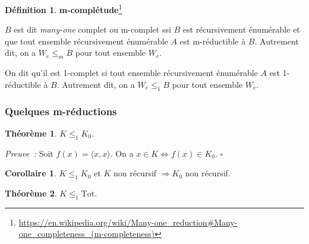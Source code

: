 \documentclass{book}
\theoremstyle{definition}
\newtheorem{theorem}{Théorème}
\newtheorem{definition}{Définition}
\newtheorem{corollary}{Corollaire}
\numberwithin{lemma}{subsection}
\numberwithin{theorem}{subsection}
\numberwithin{definition}{subsection}
\numberwithin{proposition}{subsection}
\numberwithin{corollary}{subsection}
\numberwithin{property}{subsection}
\numberwithin{example}{subsection}
\numberwithin{heuristique}{subsection}
\numberwithin{scenario}{subsection}
\newenvironment{proofi} {\noindent\emph{Preuve~:}} {\hfill $\square$\vspace{0.2cm}}
\newcommand{\Pairing}[1]{\langle #1 \rangle}
\newcommand{\EnsTot}{\mathrm{Tot}}
\begin{document}
            \begin{definition}\textbf{m-complétude}\footnote{\url{https://en.wikipedia.org/wiki/Many-one\_reduction\#Many-one\_completeness\_(m-completeness)}}
                \par $B$ est dit \textit{many-one} complet ou m-complet ssi $B$ est récursivement énumérable et que tout ensemble récursivement énumérable $A$ est m-réductible à $B$. Autrement dit, on a $W_e \leq_m B$ pour tout ensemble $W_e$.
                \par On dit qu'il est 1-complet si tout ensemble récursivement énumérable $A$ est 1-réductible à $B$. Autrement dit, on a $W_e \leq_1 B$ pour tout ensemble $W_e$.
            \end{definition}
        
        \subsubsection{Quelques m-réductions}
        
            \begin{theorem}
                $K \leq_1 K_0$.
            \end{theorem}
            
            \begin{proofi}
                Soit $f(x) = \Pairing{x,x}$. On a $x \in K \Leftrightarrow f(x) \in K_0$.
            \end{proofi}
            
            \begin{corollary}\label{cor:K0_non_rec}
                $K \leq_1 K_0$ et $K$ non récursif $\Rightarrow K_0$ non récursif.
            \end{corollary}
            
            \begin{theorem}
                $K \leq_1 \EnsTot$.
            \end{theorem}
            
\end{document}
